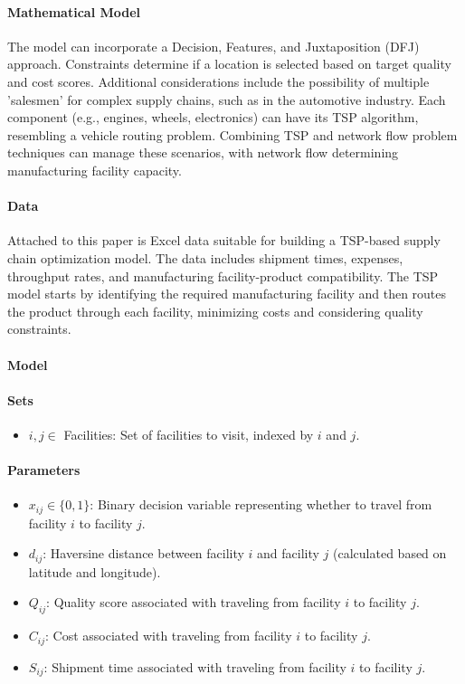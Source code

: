 \paragraph{Mathematical Model}
The model can incorporate a Decision, Features, and Juxtaposition (DFJ) approach. Constraints determine if a location is selected based on target quality and cost scores. Additional considerations include the possibility of multiple 'salesmen' for complex supply chains, such as in the automotive industry. Each component (e.g., engines, wheels, electronics) can have its TSP algorithm, resembling a vehicle routing problem. Combining TSP and network flow problem techniques can manage these scenarios, with network flow determining manufacturing facility capacity.

\paragraph{Data}

Attached to this paper is Excel data suitable for building a TSP-based supply chain optimization model. The data includes shipment times, expenses, throughput rates, and manufacturing facility-product compatibility. The TSP model starts by identifying the required manufacturing facility and then routes the product through each facility, minimizing costs and considering quality constraints.


\paragraph{Model}


\paragraph{Sets}
\begin{itemize}
    \item $i, j \in$ Facilities: Set of facilities to visit, indexed by $i$ and $j$.
\end{itemize}

\paragraph{Parameters}
\begin{itemize}
    \item $x_{ij} \in \{0, 1\}$: Binary decision variable representing whether to travel from facility $i$ to facility $j$.
    \item $d_{ij}$: Haversine distance between facility $i$ and facility $j$ (calculated based on latitude and longitude).
    \item $Q_{ij}$: Quality score associated with traveling from facility $i$ to facility $j$.
    \item $C_{ij}$: Cost associated with traveling from facility $i$ to facility $j$.
    \item $S_{ij}$: Shipment time associated with traveling from facility $i$ to facility $j$.
\end{itemize}

